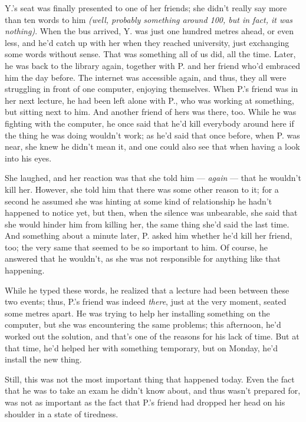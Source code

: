 Y.'s seat was finally presented to one of her friends; she didn't really say more than ten words to him \emph{(well, probably something around 100, but in fact, it was nothing)}. When the bus arrived, Y. was just one hundred metres ahead, or even less, and he'd catch up with her when they reached university, just exchanging some words without sense. That was something all of us did, all the time. 
Later, he was back to the library again, together with P. and her friend who'd embraced him the day before. The internet was accessible again, and thus, they all were struggling in front of one computer, enjoying themselves. When P.'s friend was in her next lecture, he had been left alone with P., who was working at something, but sitting next to him. And another friend of hers was there, too. While he was fighting with the computer, he once said that he'd kill everybody around here if the thing he was doing wouldn't work; as he'd said that once before, when P. was near, she knew he didn't mean it, and one could also see that when having a look into his eyes.

She laughed, and her reaction was that she told him --- \emph{again} --- that he wouldn't kill her. However, she told him that there was some other reason to it; for a second he assumed she was hinting at some kind of relationship he hadn't happened to notice yet, but then, when the silence was unbearable, she said that she would hinder him from killing her, the same thing she'd said the last time. And something about a minute later, P. asked him whether he'd kill her friend, too; the very same that seemed to be so important to him. Of course, he answered that he wouldn't, as she was not responsible for anything like that happening.

While he typed these words, he realized that a lecture had been between these two events; thus, P.'s friend was indeed \emph{there}, just at the very moment, seated some metres apart. He was trying to help her installing something on the computer, but she was encountering the same problems; this afternoon, he'd worked out the solution, and that's one of the reasons for his lack of time. But at that time, he'd helped her with something temporary, but on Monday, he'd install the new thing.

Still, this was not the most important thing that happened today. Even the fact that he was to take an exam he didn't know about, and thus wasn't prepared for, was not as important as the fact that P.'s friend had dropped her head on his shoulder in a state of tiredness.


